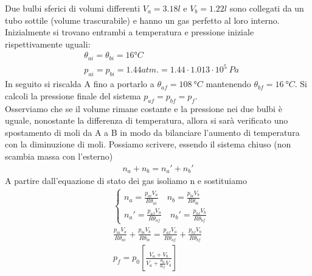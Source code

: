 \documentclass[
10pt, %
a4paper, %
oneside, %
headinclude,footinclude, %
BCOR5mm, %
]{scrartcl}
\begin{document}
\begin{exercise}
	Due bulbi sferici di volumi differenti $V_a = 3.18 l$ e $V_b = 1.22 l$ sono collegati da un tubo sottile (volume trascurabile) e hanno un gas perfetto al loro interno. Inizialmente si trovano entrambi a temperatura e pressione iniziale rispettivamente uguali:
	\begin{align*} 
		&\theta_{ai} = \theta_{bi} = 16 °C\\
		&p_{ai} = p_{bi} = 1.44 atm. = 1.44\cdot 1.013 \cdot 10^5\ Pa
	\end{align*}  
	In seguito si riscalda A fino a portarlo a $\theta_{af} = 108\ °C$ mantenendo $\theta_{bf} = 16\ °C$. Si calcoli la pressione finale del sistema $p_{af}=p_{bf}=p_f$.\\
	Osserviamo che se il volume rimane costante e la pressione nei due bulbi è uguale, nonostante la differenza di temperatura, allora si sarà verificato uno spostamento di moli da A a B in modo da bilanciare l'aumento di temperatura con la diminuzione di moli. Possiamo scrivere, essendo il sistema chiuso (non scambia massa con l'esterno)
	\begin{align*} 
		n_a + n_b = n_a' + n_b'
	\end{align*} 
	A partire dall'equazione di stato dei gas isoliamo n e sostituiamo
	\begin{align*} 
		&\begin{cases}
			n_a = \frac{p_{ai} V_a}{R \theta_{ai}} \quad n_b = \frac{p_{bi} V_b}{R \theta_{bi}}\\
			n_a' = \frac{p_{af}V_a}{R \theta_{af}} \quad n_b'= \frac{p_{bf}V_b}{R \theta_{bf}}
		\end{cases}\\
		&\frac{p_{ai}V_a}{R \theta_{ai}} + \frac{p_{bi} V_b}{R \theta_{bi}} = \frac{p_{af}V_a}{R \theta_{af}} + \frac{p_{bf}V_b}{R \theta_{bf}}\\
		&p_f = p_0\left[\frac{V_a + V_b}{V_a + \frac{\theta_{bi}}{\theta_{bf}} V_b}\right]
	\end{align*} 
\end{exercise}
\newpage
\end{document}
